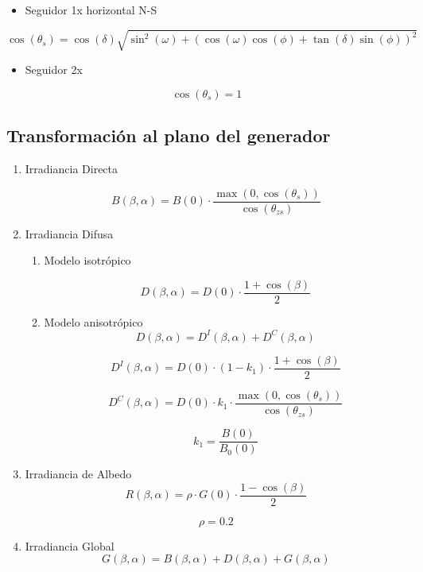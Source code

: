 \documentclass[article, a4paper]{memoir}
\begin{document}
\begin{itemize}
\item Seguidor 1x horizontal N-S
\end{itemize}
\[\cos(\theta_{s})=\cos(\delta)\sqrt{\sin^{2}(\omega)+\left(\cos(\omega)\cos(\phi)+\tan(\delta)\sin(\phi)\right)^{2}}\]

\begin{itemize}
\item Seguidor 2x
\end{itemize}
\[
  \cos(\theta_{s}) = 1
\]

\subsection{Transformación al plano del generador}
\label{sec:org71ad0da}


\begin{enumerate}
\item Irradiancia Directa
\label{sec:org408c873}

\[B(\beta,\alpha)=B(0)\cdot\frac{\max(0,\cos(\theta_{s}))}{\cos(\theta_{zs})}\]

\item Irradiancia Difusa
\label{sec:org8ebd345}

\begin{enumerate}
\item Modelo isotrópico
\label{sec:org3b83550}

\[D(\beta,\alpha)=D(0)\cdot\frac{1+\cos(\beta)}{2}\]


\item Modelo anisotrópico
\label{sec:orgeeb00c0}
\[D(\beta,\alpha) = D^{I}(\beta,\alpha)+D^{C}(\beta,\alpha)\]

\[D^{I}(\beta,\alpha) = D(0) \cdot (1-k_{1}) \cdot \frac{1 + \cos(\beta)}{2}\]

\[D^{C}(\beta,\alpha) = D(0) \cdot k_{1} \cdot \frac{\max(0,\cos(\theta_{s}))}{\cos(\theta_{zs})}\]

\[k_{1} = \frac{B(0)}{B_{0}(0)}\]
\end{enumerate}

\item Irradiancia de Albedo
\label{sec:orgfc5c19f}
\[R(\beta,\alpha)=\rho\cdot G(0)\cdot\frac{1-\cos(\beta)}{2}\]

\[\rho=0.2\]

\item Irradiancia Global
\label{sec:orgaf4b89f}
\[
G(\beta, \alpha) = B(\beta, \alpha) + D(\beta, \alpha) + G(\beta, \alpha)
\]
\end{enumerate}
\end{document}
